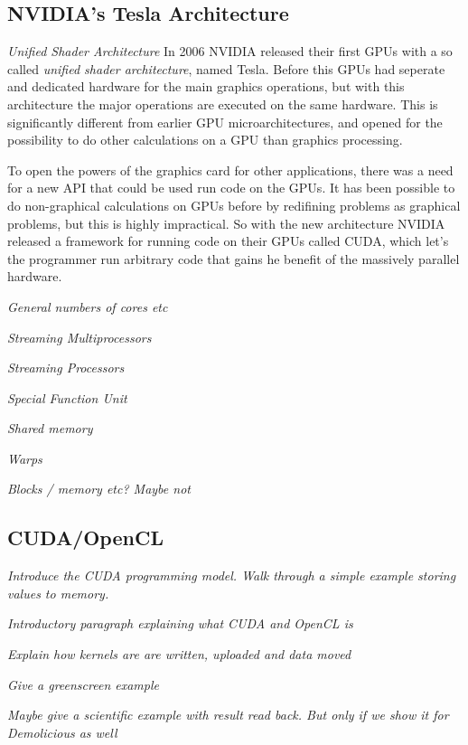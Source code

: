 \documentclass[../main/report.tex]{subfiles}
\begin{document}
\subsection{NVIDIA's Tesla Architecture} %



\emph{Unified Shader Architecture}
In 2006 NVIDIA released their first GPUs with a so called \emph{unified shader architecture}, named Tesla.
Before this GPUs had seperate and dedicated hardware for the main graphics operations, 
but with this architecture the major operations are executed on the same hardware.
This is significantly different from earlier GPU microarchitectures, and opened
for the possibility to do other calculations on a GPU than graphics processing.

To open the powers of the graphics card for other applications, there was a need for a new API that could be
used run code on the GPUs. It has been possible to do non-graphical calculations on GPUs before by 
redifining problems as graphical problems, but this is highly impractical. 
So with the new architecture NVIDIA released a framework for running code on their GPUs called CUDA, 
which let's the programmer run arbitrary code that gains he benefit of the massively parallel hardware.


\emph{General numbers of cores etc}


\emph{Streaming Multiprocessors}



\emph{Streaming Processors}

\emph{Special Function Unit}

\emph{Shared memory}

\emph{Warps}

\emph{Blocks / memory etc? Maybe not}



\subsection{CUDA/OpenCL}
\emph{Introduce the CUDA programming model. Walk through a simple example storing values to memory.}

\emph{Introductory paragraph explaining what CUDA and OpenCL is}

\emph{Explain how kernels are are written, uploaded and data moved}

\emph{Give a greenscreen example}

\emph{Maybe give a scientific example with result read back. But only if we show it for Demolicious as well}
\end{document}
